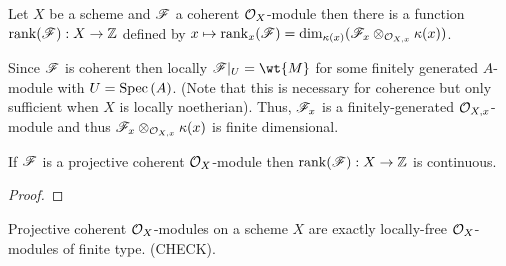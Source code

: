 \documentclass[12pt]{article}
\begin{document}
\begin{definition}
Let $X$ be a scheme and $\mathscr{F}$ a coherent $\mathcal{O}_{X}$-module then there is a function $\mathrm{rank}(\mathscr{F}) : X \to \mathbb{Z}$ defined by $x \mapsto \mathrm{rank}_x(\mathscr{F}) = \dim_{\kappa(x)}(\mathscr{F}_x \otimes_{\mathcal{O}_{X, x}} \kappa(x))$. 
\end{definition}

\begin{remark}
Since $\mathscr{F}$ is coherent then locally $\F |_U = \wt{M}$ for some finitely generated $A$-module with $U = \mathrm{Spec}\left( A \right)$. (Note that this is necessary for coherence but only sufficient when $X$ is locally noetherian). Thus, $\mathscr{F}_x$ is a finitely-generated $\mathcal{O}_{X, x}$-module and thus $\mathscr{F}_x \otimes_{\mathcal{O}_{X, x}} \kappa(x)$ is finite dimensional. 
\end{remark}

\begin{theorem}
If $\mathscr{F}$ is a projective coherent $\mathcal{O}_{X}$-module then $\mathrm{rank}(\mathscr{F}) : X \to \mathbb{Z}$ is continuous. 
\end{theorem}

\begin{proof}

\end{proof}

\begin{proposition}
Projective coherent $\mathcal{O}_{X}$-modules on a scheme $X$ are exactly locally-free $\mathcal{O}_{X}$-modules of finite type. (CHECK).
\end{proposition}
\end{document}
